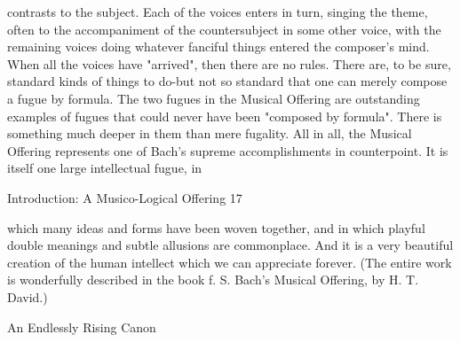 contrasts to the subject. Each of the voices enters in turn, singing the theme, often to the
accompaniment of the countersubject in some other voice, with the remaining voices
doing whatever fanciful things entered the composer's mind. When all the voices have
"arrived", then there are no rules. There are, to be sure, standard kinds of things to do-but
not so standard that one can merely compose a fugue by formula. The two fugues in the
Musical Offering are outstanding examples of fugues that could never have been
"composed by formula". There is something much deeper in them than mere fugality.
   All in all, the Musical Offering represents one of Bach's supreme accomplishments in
counterpoint. It is itself one large intellectual fugue, in




Introduction: A Musico-Logical Offering                                                   17

which many ideas and forms have been woven together, and in which playful double
meanings and subtle allusions are commonplace. And it is a very beautiful creation of the
human intellect which we can appreciate forever. (The entire work is wonderfully
described in the book f. S. Bach's Musical Offering, by H. T. David.)

                                An Endlessly Rising Canon


